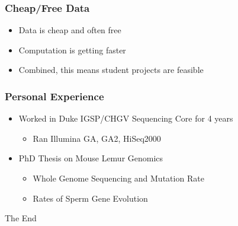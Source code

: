 \documentclass{beamer}
\begin{document}
\begin{frame}
\frametitle{Cheap/Free Data}
\begin{itemize}
	\item Data is cheap and often free
	\item Computation is getting faster
	\item Combined, this means student projects are feasible
\end{itemize}
\end{frame}
\begin{frame}
\frametitle{Personal Experience}
\begin{itemize}
	\item Worked in Duke IGSP/CHGV Sequencing Core for 4 years
	\begin{itemize}
		\item Ran Illumina GA, GA2, HiSeq2000
	\end{itemize}
	\item PhD Thesis on Mouse Lemur Genomics
	\begin{itemize}
		\item Whole Genome Sequencing and Mutation Rate
		\item Rates of Sperm Gene Evolution
	\end{itemize}
\end{itemize}
\end{frame}

\begin{frame}
\Huge{\centerline{The End}}
\end{frame}

\end{document}
